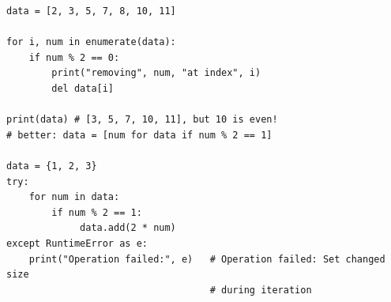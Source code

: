 
\begin{frame}[fragile]
%
\begin{codebox}[foo]
\begin{verbatim}
data = [2, 3, 5, 7, 8, 10, 11]

for i, num in enumerate(data):
    if num % 2 == 0:
        print("removing", num, "at index", i)
        del data[i]

print(data) # [3, 5, 7, 10, 11], but 10 is even!
# better: data = [num for data if num % 2 == 1]

data = {1, 2, 3}
try:
    for num in data:
        if num % 2 == 1:
             data.add(2 * num)
except RuntimeError as e:
    print("Operation failed:", e)   # Operation failed: Set changed size 
                                    # during iteration
\end{verbatim}
\end{codebox}
%
\end{frame}


